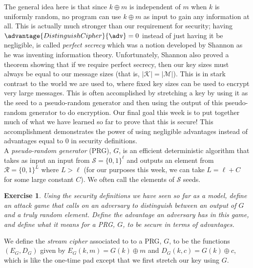 \documentclass[12pt]{article}
\newcommand{\verts}[1]{\left\vert #1\right\vert}
\newcommand{\M}{\mathcal{M}}
\newcommand{\K}{\mathcal{K}}
\newtheorem{exercise}{Exercise}
\theoremstyle{definition}
\theoremstyle{remark}
\theoremstyle{definition}
\begin{document}
The general idea here is that since $k\oplus m$ is independent of $m$ when $k$ is uniformly random, no program can use $k\oplus m$ as input to gain any information at all. This is actually much stronger than our requirement for security; having $\advantage{DistinguishCipher}{\adv} = 0$ instead of just having it be negligible, is called \emph{perfect secrecy} which was a notion developed by Shannon as he was inventing information theory. Unfortunately, Shannon also proved a theorem showing that if we require perfect secrecy, then our key sizes must always be equal to our message sizes (that is, $\verts{\K} = \verts{\M}$). This is in stark contrast to the world we are used to, where fixed key sizes can be used to encrypt very large messages. This is often accomplished by stretching a key by using it as the seed to a pseudo-random generator and then using the output of this pseudo-random generator to do encryption. Our final goal this week is to put together much of what we have learned so far to prove that this is secure! This accomplishment demonstrates the power of using negligible advantages instead of advantages equal to $0$ in security definitions.\\

A \emph{pseudo-random generator} (PRG), $G$, is an efficient deterministic algorithm that takes as input an input from $\mathcal{S} = \{0,1\}^\ell$ and outputs an element from $\mathcal{R} = \{0,1\}^L$ where $L > \ell$ (for our purposes this week, we can take $L = \ell + C$ for some large constant $C$). We often call the elements of $\mathcal{S}$ seeds.

\begin{exercise}\label{ex:DefinePRG} Using the security definitions we have seen so far as a model, define an attack game that calls on an adversary to distinguish between an output of $G$ and a truly random element. Define the advantage an adversary has in this game, and define what it means for a PRG, $G$, to be secure in terms of advantages.
\end{exercise}

We define the \emph{stream cipher} associated to to a PRG, $G$, to be the functions $(E_G, D_G)$ given by $E_G(k, m) = G(k)\oplus m$ and $D_G(k, c) = G(k)\oplus c$, which is like the one-time pad except that we first stretch our key using $G$.
\end{document}
